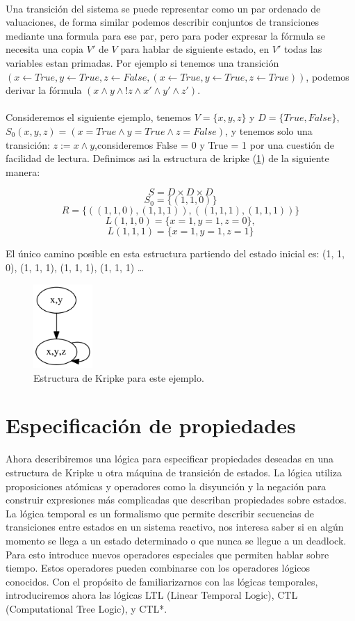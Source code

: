 \\
Una transición del sistema se puede representar como un par ordenado de valuaciones, de forma similar podemos describir conjuntos de transiciones mediante una formula para ese par, pero para poder expresar la fórmula se necesita una copia $V'$ de $V$ para hablar de siguiente estado, en $V'$ todas las variables estan primadas. Por ejemplo si tenemos una transición $(x \gets True, y \gets True, z \gets False,(x \gets True, y \gets True, z \gets True))$, podemos derivar la fórmula $(x \land y \land !z \land x' \land y' \land z')$.\\
\\
Consideremos el siguiente ejemplo, tenemos $V = \{x,y,z\}$ y $D = \{True, False\}$, $S_{0} (x,y,z) = (x= True \land y = True \land z = False)$, y tenemos solo una transición: $z := x \land y$,consideremos False = 0 y True = 1 por una cuestión de facilidad de lectura. Definimos asi la estructura de kripke (\ref{fig:kripke1})  de la siguiente manera:

\[S = D \times D \times D\]
\[S_{0} = \{(1, 1, 0)\}\]
\[R = \{((1, 1, 0), (1, 1, 1)), ((1, 1, 1), (1, 1, 1))\}\]
\[L (1, 1, 0) = \{x = 1, y = 1, z = 0\},\]
\[L (1, 1, 1) = \{x = 1, y = 1, z = 1\}\]

El único camino posible en esta estructura partiendo del estado inicial es: (1, 1, 0), (1, 1, 1), (1, 1, 1), (1, 1, 1) …

\begin{figure}[h!]
  \centering
  \includegraphics[width=0.2\textwidth]{Figures/kripke.png}
  \caption{Estructura de Kripke para este ejemplo.}
  \label{fig:kripke1}
\end{figure}

\section{Especificación de propiedades}

Ahora describiremos una lógica para especificar propiedades deseadas en una estructura de Kripke u otra máquina de transición de estados. La lógica utiliza proposiciones atómicas y operadores como la disyunción y la negación para construir expresiones más complicadas que describan propiedades sobre estados.
La lógica temporal es un formalismo que permite describir secuencias de transiciones entre estados en un sistema reactivo, nos interesa saber si en algún momento se llega a un estado determinado o que nunca se llegue a un deadlock. Para esto introduce nuevos operadores especiales que permiten hablar sobre tiempo. Estos operadores pueden combinarse con los operadores lógicos conocidos.
Con el propósito de familiarizarnos con las lógicas temporales, introduciremos ahora las lógicas LTL (Linear Temporal Logic), CTL (Computational Tree Logic), y CTL*. 

